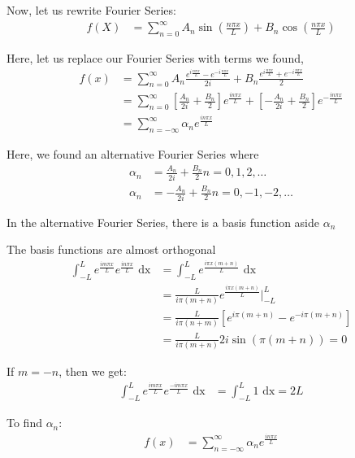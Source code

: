 Now, let us rewrite Fourier Series:
%
\begin{align}
  f(X) & = \sum^\infty_{n = 0} A_n \sin\left(\frac{n \pi x}{L}\right) + B_n \cos\left(\frac{n \pi x}{L}\right)
\end{align}

Here, let us replace our Fourier Series with terms we found,
%
\begin{align}
  f(x) & =
  \sum^\infty_{n = 0}
  A_n \frac
  {
    e^{i \frac{n \pi x}{L}} - e^{-i \frac{n \pi x}{L}}
  }
  {
    2 i
  }
  + B_n \frac
  {
    e^{i\frac{n \pi x}{L}} + e^{-i \frac{n \pi x}{L}}
  }
  {
    2
  }\\
  & =
  \sum^\infty_{n = 0}
  \left[
    \frac{A_n}{2i} + \frac{B_n}{2}
  \right]
  e^{\frac{i n \pi x}{L}}
  +
  \left[
    - \frac{A_n}{2i} + \frac{B_n}{2}
  \right]
  e^{- \frac{i n \pi x}{L}}\\
  & = \sum^\infty_{n = -\infty} \alpha_n e^{\frac{i n \pi x}{L}}
\end{align}

Here, we found an alternative Fourier Series where
%
\begin{align}
  \alpha_n & = \frac{A_n}{2i} + \frac{B_n}{2}  n = 0, 1, 2, \ldots\\
  \alpha_n & = -\frac{A_n}{2i} + \frac{B_n}{2} n = 0, -1, -2, \ldots
\end{align}

In the alternative Fourier Series, there is a basis function aside $\alpha_n$

The basis functions are almost orthogonal
%
\begin{align}
  \int^L_{-L}
  e^{\frac{i m \pi x}{L}} e^{\frac{i n \pi x}{L}} \text{ dx} & =
  \int^L_{-L}
  e^{\frac{i \pi x (m + n)}{L}} \text{ dx}\\
  & = \frac{L}{i \pi(m + n)} e^{\frac{i \pi x(m + n)}{L}} \Big|^L_{-L}\\
  & = \frac{L}{i \pi(n + m)} \left[ e^{i \pi(m + n)} - e^{-i \pi(m + n)} \right]\\
  & = \frac{L}{i \pi(m + n)} 2 i \sin(\pi(m + n)) = 0
\end{align}

If $m = -n$, then we get:
%
\begin{align}
  \int^L_{-L} e^{\frac{i m \pi x}{L}} e^{\frac{-i m \pi x}{L}} \text{ dx}
  & = \int^L_{-L} 1 \text{ dx} = 2L
\end{align}

To find $\alpha_n$:
%
\begin{align}
  f(x) & = \sum^\infty_{n = - \infty} \alpha_n e^{\frac{i n \pi x}{L}}
\end{align}

